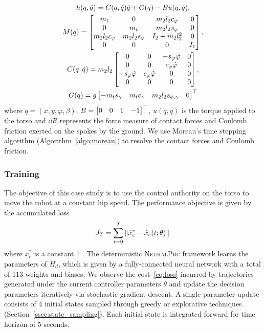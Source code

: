 \begin{equation*}
  \begin{gathered}
    h(q, \dot{q}) = C(q, \dot{q})\dot{q} + G(q) - Bu(q, \dot{q}),\\
    M(q) = \begin{bmatrix}m_t & 0 & m_2 l_2 c_{\varphi} & 0 \\ 0 & m_t & m_2 l_2 s_{\varphi} & 0 \\
            m_2 l_2 c_{\varphi} & m_2 l_2 s_{\varphi} & I_2+m_2 l_2^2 & 0 \\
            0 & 0 & 0 & I_1\end{bmatrix}, \\
    C(q,\dot{q}) = m_2l_2 \begin{bmatrix}0 & 0 & -s_{\varphi} \dot{\varphi} & 0\\ 
                    0 & 0 & c_{\varphi} \dot{\varphi} & 0 \\ 
                    -s_{\varphi} \dot{\varphi} & c_{\varphi} \dot{\varphi} & 0 & 0 \\
                    0 & 0 & 0 & 0\end{bmatrix}, \\
    G(q) = g\begin{bmatrix}-m_t s_{\gamma} & 
                  m_t c_{\gamma} &
                  m_2 l_2 s_{\phi,\gamma} &
                  0\end{bmatrix}^\top \\
  \end{gathered}
\end{equation*}
\noindent where $q = (x, y, \varphi, \beta)$, $B = \begin{bmatrix}0 & 0 & 1 & -1\end{bmatrix}^\top$,
$u(q, \dot{q})$ is the torque applied to the torso and $\dd R$ represents the
force measure of contact forces and Coulomb friction exerted on the spokes by
the ground. We use Moreau's time stepping algorithm
(Algorithm~\eqref{algo:moreau}) to resolve the contact forces and Coulomb
friction.


\subsubsection{Training}
\label{sssec:training}

The objective of this case study is to use the control authority on the torso to
move the robot at a constant hip speed.
%
The performance objective is given by the accumulated loss
\begin{align}
    J_T = \sum_{t=0}^{T} \|{\dot{x}_c^* - \dot{x}_c(t; \theta)}\|_{{}_{}}
    \label{eq:loss}
\end{align}
\noindent where $\dot{x}_c^*$ is a constant 1 .
%
The deterministic \textsc{NeuralPbc} framework learns the parameters of $H_d$,
which is given by a fully-connected neural network with a total of 113 weights
and biases.   
%
We observe the cost~\eqref{eq:loss} incurred by trajectories generated under the
current controller parameters $\theta$ and update the decision parameters
iteratively via stochastic gradient descent.
%
A single parameter update consists of 4 initial states sampled
through greedy or explorative techniques (Section~\ref{ssec:state_sampling}).
%
Each initial state is integrated forward for time horizon of 5 seconds.
%

